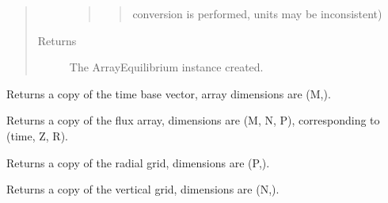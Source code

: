 \documentclass[letterpaper,10pt,english]{sphinxmanual}
\begin{document}
\begin{fulllineitems}
\begin{quote}
\begin{description}
\begin{quote}
\begin{quote}
conversion is performed, units may be
inconsistent)
\end{quote}
\end{quote}

\item[{Returns}] \leavevmode
The ArrayEquilibrium instance created.

\end{description}\end{quote}

\begin{fulllineitems}
\label{eqtools:eqtools.FromArrays.ArrayEquilibrium.getTimeBase}
Returns a copy of the time base vector, array dimensions are (M,).

\end{fulllineitems}


\begin{fulllineitems}
\label{eqtools:eqtools.FromArrays.ArrayEquilibrium.getFluxGrid}
Returns a copy of the flux array, dimensions are (M, N, P), corresponding to (time, Z, R).

\end{fulllineitems}


\begin{fulllineitems}
\label{eqtools:eqtools.FromArrays.ArrayEquilibrium.getRGrid}
Returns a copy of the radial grid, dimensions are (P,).

\end{fulllineitems}


\begin{fulllineitems}
\label{eqtools:eqtools.FromArrays.ArrayEquilibrium.getZGrid}
Returns a copy of the vertical grid, dimensions are (N,).

\end{fulllineitems}


\end{fulllineitems}
\end{document}
